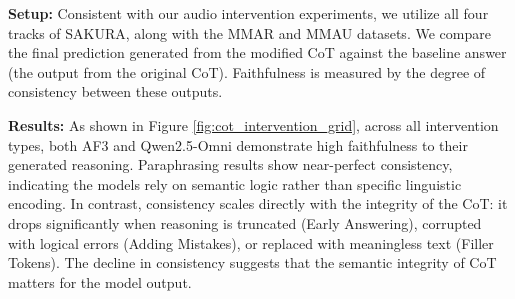 \noindent \textbf{Setup:} Consistent with our audio intervention experiments, we utilize all four tracks of SAKURA, along with the MMAR and MMAU datasets. We compare the final prediction generated from the modified CoT against the baseline answer (the output from the original CoT). Faithfulness is measured by the degree of consistency between these outputs.


\noindent \textbf{Results:} As shown in Figure \ref{fig:cot_intervention_grid}, across all intervention types, both AF3 and Qwen2.5-Omni demonstrate high faithfulness to their generated reasoning. Paraphrasing results show near-perfect consistency, indicating the models rely on semantic logic rather than specific linguistic encoding. In contrast, consistency scales directly with the integrity of the CoT: it drops significantly when reasoning is truncated (Early Answering), corrupted with logical errors (Adding Mistakes), or replaced with meaningless text (Filler Tokens). The decline in consistency suggests that the semantic integrity of CoT matters for the model output.

